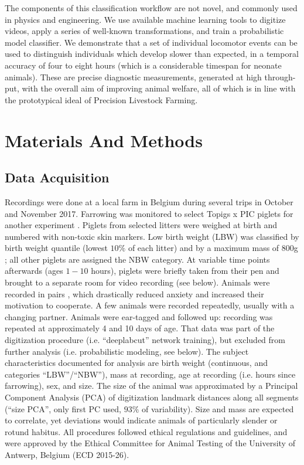 The components of this classification workflow are not novel, and commonly used in physics and engineering.
We use available machine learning tools to digitize videos, apply a series of well-known transformations, and train a probabilistic model classifier.
We demonstrate that a set of individual locomotor events can be used to distinguish individuals which develop slower than expected, in a temporal accuracy of four to eight hours (which is a considerable timespan for neonate animals).
These are precise diagnostic measurements, generated at high through-put, with the overall aim of improving animal welfare, all of which is in line with the prototypical ideal of Precision Livestock Farming.


\FloatBarrier
\clearpage
\section{Materials And Methods}
\label{methods}

\subsection{Data Acquisition}
\label{sec:orgd0bae22}

Recordings were done at a local farm in Belgium during several trips in October and November 2017.
Farrowing was monitored to select Topigs x PIC piglets for another experiment \citep{Ayuso2021}.
Piglets from selected litters were weighed at birth and numbered with non-toxic skin markers.
Low birth weight (LBW) was classified by birth weight quantile (lowest \(10 \%\) of each litter) and by a maximum mass of \(800\)g \citep{Litten2003,VanTichelen2021,Wang2016,DInca2011}; all other piglets are assigned the NBW category.
At variable time points afterwards (ages \(1 - 10\) hours), piglets were briefly taken from their pen and brought to a separate room for video recording (see below).
Animals were recorded in pairs \citep[as in][]{Mielke2018}, which drastically reduced anxiety and increased their motivation to cooperate.
A few animals were recorded repeatedly, usually with a changing partner.
Animals were ear-tagged and followed up: recording was repeated at approximately 4 and 10 days of age.
That data was part of the digitization procedure (i.e. ``deeplabcut'' network training), but excluded from further analysis (i.e. probabilistic modeling, see below).
The subject characteristics documented for analysis are birth weight (continuous, and categories ``LBW''/``NBW''), mass at recording, age at recording (i.e. hours since farrowing), sex, and size.
The size of the animal was approximated by a Principal Component Analysis (PCA) of digitization landmark distances along all segments (``size PCA'', only first PC used,
\(93 \%\)
of variability).
Size and mass are expected to correlate, yet deviations would indicate animals of particularly slender or rotund habitus.
All procedures followed ethical regulations and guidelines, and were approved by the Ethical Committee for Animal Testing of the University of Antwerp, Belgium (ECD 2015-26).



